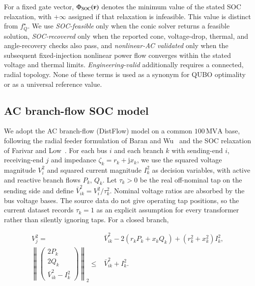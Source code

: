 \documentclass[5p,twocolumn,number,sort&compress,nopreprintline]{elsarticle}
\begin{document}
For a fixed gate vector, $\Phi_{\rm SOC}(\boldsymbol v)$ denotes the
minimum value of the stated SOC relaxation, with $+\infty$ assigned if
that relaxation is infeasible. This value is distinct from
$f_Q^\star$. We use \emph{SOC-feasible} only when the conic solver
returns a feasible solution, \emph{SOC-recovered} only when the
reported cone, voltage-drop, thermal, and angle-recovery checks also
pass, and \emph{nonlinear-AC validated} only when the subsequent
fixed-injection nonlinear power flow converges within the stated
voltage and thermal limits. \emph{Engineering-valid} additionally
requires a connected, radial topology. None of these terms is used as
a synonym for QUBO optimality or as a universal reference value.

\subsection{AC branch-flow SOC model}
\label{sec:soc}
We adopt the AC branch-flow (DistFlow) model on a common
$100\,\text{MVA}$ base, following the radial feeder formulation of
Baran and Wu~\cite{baran1989reconfiguration} and the SOC relaxation
of Farivar and Low~\cite{farivar2013branchflow}. For each bus
$i$ and each branch $k$ with sending-end $i$, receiving-end $j$ and
impedance $\zeta_k = r_k + \mathrm{j} x_k$, we use the squared voltage
magnitude $V_i^2$ and squared current magnitude $I_k^2$ as decision
variables, with active and reactive branch flows $P_k$, $Q_k$. Let
$\tau_k>0$ be the real off-nominal tap on the sending side and define
$\bar V_{ik}^2=V_i^2/\tau_k^2$. Nominal voltage ratios are absorbed by
the bus voltage bases. The source data do not give operating tap
positions, so the current dataset records $\tau_k=1$ as an explicit
assumption for every transformer rather than silently ignoring taps.
For a closed branch,

\begin{subequations}\label{eq:soc-branch}
\begin{align}
V_j^2={}&\bar V_{ik}^2-2(r_kP_k+x_kQ_k)
 +(r_k^2+x_k^2)I_k^2,\label{eq:soc-vdrop}\\
\left\|\begin{pmatrix}2P_k\\2Q_k\\\bar V_{ik}^2-I_k^2\end{pmatrix}\right\|_2
\le{}&\bar V_{ik}^2+I_k^2.\label{eq:soc-cone}
\end{align}
\end{subequations}
\end{document}
